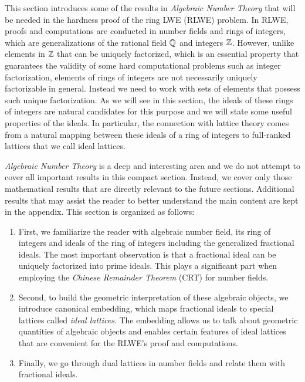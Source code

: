 \documentclass[../main.tex]{subfiles}
\begin{document}

This section introduces some of the results in \textit{Algebraic Number Theory} that will be needed in the hardness proof of the ring LWE (RLWE) problem. In RLWE, proofs and computations are conducted in number fields and rings of integers, which are generalizations of the rational field $\mathbb{Q}$ and integers $\mathbb{Z}$. However, unlike elements in $\mathbb{Z}$ that can be uniquely factorized, which is an essential property that guarantees the validity of some hard computational problems such as integer factorization, elements of rings of integers are not necessarily uniquely factorizable in general. Instead we need to work with sets of elements that possess such unique factorization. As we will see in this section, the ideals of these rings of integers are natural candidates for this purpose and we will state some useful properties of the ideals. 
In particular, the connection with lattice theory comes from a natural mapping between these ideals of a ring of integers to full-ranked lattices that we call ideal lattices.

\textit{Algebraic Number Theory} is a deep and interesting area and we do not attempt to cover all important results in this compact section. Instead, we cover only those mathematical results that are directly relevant to the future sections. Additional results that may assist the reader to better understand the main content are kept in the appendix. This section is organized as follows:
\begin{enumerate}
	\item First, we familiarize the reader with algebraic number field, its ring of integers and ideals of the ring of integers including the generalized fractional ideals. The most important observation is that a fractional ideal can be uniquely factorized into prime ideals. This plays a significant part when employing the \textit{Chinese Remainder Theorem} (CRT) for number fields. 
	 
	\item Second, to build the geometric interpretation of these algebraic objects, we introduce canonical embedding, which maps fractional ideals to special lattices called \textit{ideal lattices}. The embedding allows us to talk about geometric quantities of algebraic objects and enables certain features of ideal lattices that are convenient for the RLWE's proof and computations. 
	
	\item Finally, we go through dual lattices in number fields and relate them with fractional ideals.
	
	
\end{enumerate}
\end{document}
